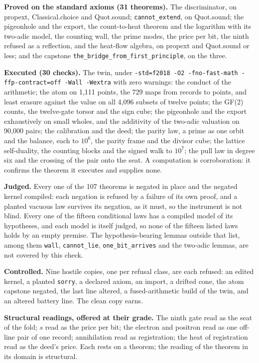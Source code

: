 \documentclass[10pt,twocolumn]{article}
\begin{document}
\textbf{Proved on the standard axioms (31 theorems).} The discriminator,
on propext, Classical.choice and Quot.sound; \texttt{cannot\_\allowbreak{}extend}, on
Quot.sound; the pigeonhole and the export, the count-to-heat theorem and
the logarithm with its two-adic model, the counting wall, the prime
modes, the price per bit, the ninth refused as a reflection, and the
heat-flow algebra, on propext and Quot.sound or less; and the capstone
\texttt{the\_\allowbreak{}bridge\_\allowbreak{}from\_\allowbreak{}first\_\allowbreak{}principle}, on the three.

\textbf{Executed (30 checks).} The twin, under
\texttt{-std=f2018\ -O2\ -fno-fast-math\ -ffp-contract=off\ -Wall\ -Wextra}
with zero warnings: the conduct of the arithmetic; the atom on 1,111
points, the 729 maps from records to points, and least erasure against
the value on all 4,096 subsets of twelve points; the GF(2) counts, the
twelve-gate torsor and the sign cube; the pigeonhole and the export
exhaustively on small wholes, and the additivity of the two-adic
valuation on 90,000 pairs; the calibration and the deed; the parity law,
a prime as one orbit and the balance, each to \(10^6\), the parity frame
and the divisor cube; the lattice self-duality, the counting blocks and
the signed walk to \(10^7\); the pull law in degree six and the crossing
of the pair onto the seat. A computation is corroboration: it confirms
the theorem it executes and supplies none.

\textbf{Judged.} Every one of the 107 theorems is negated in place and
the negated kernel compiled: each negation is refused by a failure of
its own proof, and a planted vacuous law survives its negation, as it
must, so the instrument is not blind. Every one of the fifteen
conditional laws has a compiled model of its hypotheses, and each model
is itself judged, so none of the fifteen listed laws holds by an empty
premise. The hypothesis-bearing lemmas outside that list, among them
\texttt{wall}, \texttt{cannot\_\allowbreak{}lie}, \texttt{one\_\allowbreak{}bit\_\allowbreak{}arrives} and the
two-adic lemmas, are not covered by this check.

\textbf{Controlled.} Nine hostile copies, one per refusal class, are
each refused: an edited kernel, a planted \texttt{sorry}, a declared
axiom, an import, a drifted cone, the atom capstone negated, the last
line altered, a fused-arithmetic build of the twin, and an altered
battery line. The clean copy earns.

\textbf{Structural readings, offered at their grade.} The ninth gate
read as the seat of the fold; \(s\) read as the price per bit; the
electron and positron read as one off-line pair of one record;
annihilation read as registration; the heat of registration read as the
deed's price. Each rests on a theorem; the reading of the theorem in its
domain is structural.
\end{document}
